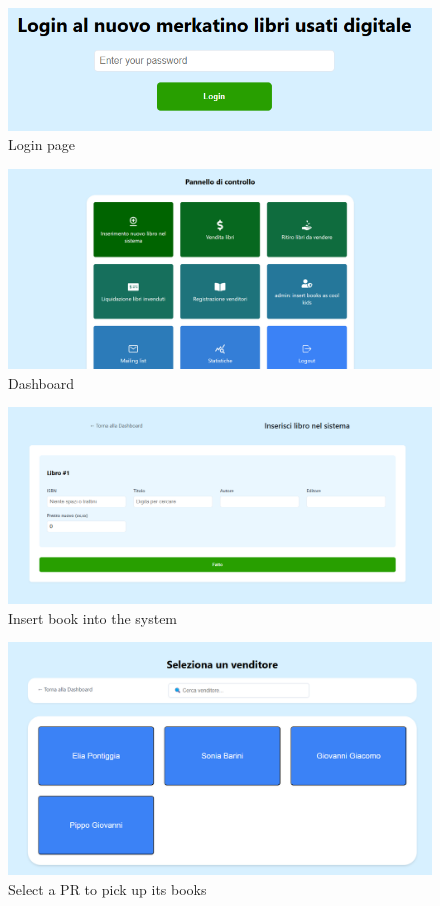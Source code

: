 \begin{figure}[ht]
    \centering
    \includegraphics[width=.5\textwidth]{assets/ui_mockup/login.png}
    \caption{Login page}
    \label{fig:login}
\end{figure}

\begin{figure}[ht]
    \centering
    \includegraphics[width=.75\textwidth]{assets/ui_mockup/dashboard.png}
    \caption{Dashboard}
    \label{fig:dashboard}
\end{figure}

\begin{figure}[ht]
    \centering
    \includegraphics[width=.75\textwidth]{assets/ui_mockup/insert_book.png}
    \caption{Insert book into the system}
    \label{fig:insert_book}
\end{figure}

\begin{figure}[ht]
    \centering
    \includegraphics[width=.75\textwidth]{assets/ui_mockup/pickup_pr.png}
    \caption{Select a PR to pick up its books}
    \label{fig:pickup_pr}
\end{figure}

